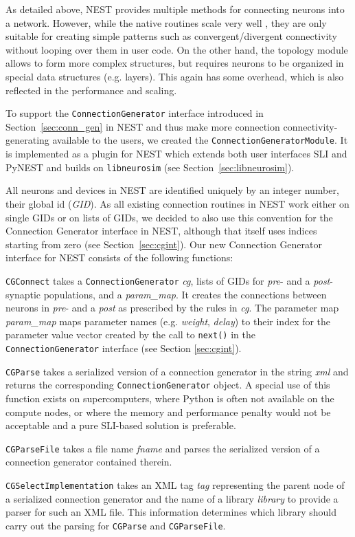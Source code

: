 \documentclass{frontiersSCNS} %
\begin{document}
As detailed above, NEST provides multiple methods for connecting
neurons into a network. However, while the native routines scale very
well \citep{Helias12_26}, they are only suitable for creating simple
patterns such as convergent/divergent connectivity without looping
over them in user code. On the other hand, the topology module
\citep{Plesser_13} allows to form more complex structures, but
requires neurons to be organized in special data structures (e.g.
layers). This again has some overhead, which is also reflected in the
performance and scaling.

To support the \verb|ConnectionGenerator| interface introduced in
Section~\ref{sec:conn_gen} in NEST and thus make more connection
connectivity-generating available to the users, we created the
\verb|ConnectionGeneratorModule|. It is implemented as a plugin for
NEST which extends both user interfaces SLI and PyNEST and builds on
\verb|libneurosim| (see Section~\ref{sec:libneurosim}).

All neurons and devices in NEST are identified uniquely by an integer
number, their global id (\emph{GID}). As all existing connection
routines in NEST work either on single GIDs or on lists of GIDs, we
decided to also use this convention for the Connection Generator
interface in NEST, although that itself uses indices starting from
zero (see Section~\ref{sec:cgint}). Our new Connection Generator
interface for NEST consists of the following functions:

\begin{unlist}
\item[\tt CGConnect] takes a \verb|ConnectionGenerator| \emph{cg},
  lists of GIDs for \emph{pre}- and a \emph{post}-synaptic
  populations, and a \emph{param\_map}. It creates the connections
  between neurons in \emph{pre}- and a \emph{post} as prescribed by
  the rules in \emph{cg}. The parameter map \emph{param\_map} maps
  parameter names (e.g. \emph{weight}, \emph{delay}) to their index
  for the parameter value vector created by the call to \verb|next()|
  in the \verb|ConnectionGenerator| interface (see Section
  \ref{sec:cgint}).
\item[\tt CGParse] takes a serialized version of a connection
  generator in the string \emph{xml} and returns the corresponding
  \verb|ConnectionGenerator| object. A special use of this function
  exists on supercomputers, where Python is often not available on the
  compute nodes, or where the memory and performance penalty would not
  be acceptable and a pure SLI-based solution is preferable.
\item[\tt CGParseFile] takes a file name \emph{fname} and parses the
  serialized version of a connection generator contained therein.
\item[\tt CGSelectImplementation] takes an XML tag \emph{tag}
  representing the parent node of a serialized connection generator
  and the name of a library \emph{library} to provide a parser for
  such an XML file. This information determines which library should
  carry out the parsing for \verb|CGParse| and \verb|CGParseFile|.
\end{unlist}
\end{document}
